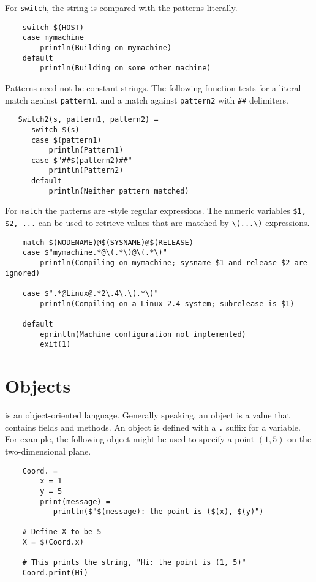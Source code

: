 For \verb+switch+, the string is compared with the patterns literally.

\begin{verbatim}
    switch $(HOST)
    case mymachine
        println(Building on mymachine)
    default
        println(Building on some other machine)
\end{verbatim}

Patterns need not be constant strings.  The following function tests
for a literal match against \verb+pattern1+, and a match against
\verb+pattern2+ with \verb+##+ delimiters.

\begin{verbatim}
   Switch2(s, pattern1, pattern2) =
      switch $(s)
      case $(pattern1)
          println(Pattern1)
      case $"##$(pattern2)##"
          println(Pattern2)
      default
          println(Neither pattern matched)
\end{verbatim}

For \verb+match+ the patterns are -style regular expressions.
The numeric variables \verb+$1, $2, ...+ can be used to retrieve values
that are matched by \verb+\(...\)+ expressions.

\begin{verbatim}
    match $(NODENAME)@$(SYSNAME)@$(RELEASE)
    case $"mymachine.*@\(.*\)@\(.*\)"
        println(Compiling on mymachine; sysname $1 and release $2 are ignored)

    case $".*@Linux@.*2\.4\.\(.*\)"
        println(Compiling on a Linux 2.4 system; subrelease is $1)

    default
        eprintln(Machine configuration not implemented)
        exit(1)
\end{verbatim}

%
\section{Objects}
\label{section:objects}

\OMake{} is an object-oriented language.  Generally speaking, an object is a value that contains fields
and methods.  An object is defined with a \verb+.+ suffix for a variable.  For example, the
following object might be used to specify a point $(1, 5)$ on the two-dimensional plane.

\begin{verbatim}
    Coord. =
        x = 1
        y = 5
        print(message) =
           println($"$(message): the point is ($(x), $(y)")

    # Define X to be 5
    X = $(Coord.x)

    # This prints the string, "Hi: the point is (1, 5)"
    Coord.print(Hi)
\end{verbatim}


